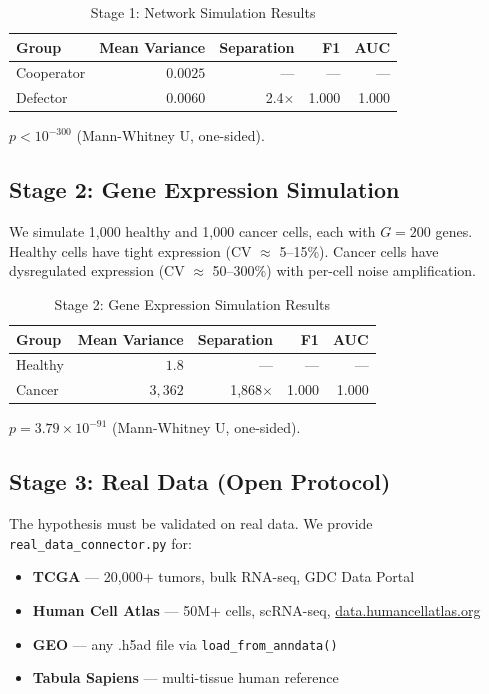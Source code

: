 \documentclass[12pt, letterpaper]{article}
\begin{document}
\begin{table}[h]
\centering
\caption{Stage 1: Network Simulation Results}
\begin{tabular}{lrrrr}
\toprule
Group & Mean Variance & Separation & F1 & AUC \\
\midrule
Cooperator & $0.0025$ & --- & --- & --- \\
Defector & $0.0060$ & 2.4$\times$ & 1.000 & 1.000 \\
\bottomrule
\end{tabular}
\end{table}

$p < 10^{-300}$ (Mann-Whitney U, one-sided).

\subsection{Stage 2: Gene Expression Simulation}

We simulate 1,000 healthy and 1,000 cancer cells, each with $G = 200$ genes. Healthy cells have tight expression (CV $\approx$ 5--15\%). Cancer cells have dysregulated expression (CV $\approx$ 50--300\%) with per-cell noise amplification.

\begin{table}[h]
\centering
\caption{Stage 2: Gene Expression Simulation Results}
\begin{tabular}{lrrrr}
\toprule
Group & Mean Variance & Separation & F1 & AUC \\
\midrule
Healthy & $1.8$ & --- & --- & --- \\
Cancer & $3{,}362$ & 1,868$\times$ & 1.000 & 1.000 \\
\bottomrule
\end{tabular}
\end{table}

$p = 3.79 \times 10^{-91}$ (Mann-Whitney U, one-sided).

\subsection{Stage 3: Real Data (Open Protocol)}

The hypothesis must be validated on real data. We provide \texttt{real\_data\_connector.py} for:
\begin{itemize}
    \item \textbf{TCGA} --- 20,000+ tumors, bulk RNA-seq, GDC Data Portal
    \item \textbf{Human Cell Atlas} --- 50M+ cells, scRNA-seq, \href{https://data.humancellatlas.org}{data.humancellatlas.org}
    \item \textbf{GEO} --- any .h5ad file via \texttt{load\_from\_anndata()}
    \item \textbf{Tabula Sapiens} --- multi-tissue human reference
\end{itemize}
\end{document}
